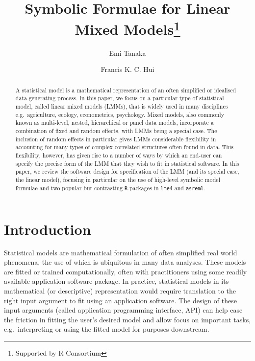 \documentclass[runningheads]{llncs}\usepackage[]{graphicx}\usepackage[]{color}
\title{Symbolic Formulae for Linear Mixed Models\thanks{Supported by R Consortium}}
\author{Emi Tanaka\inst{1,2} \and Francis K. C. Hui\inst{3}}
\institute{The University of Sydney, Camperdown NSW 2008, Australia\\\and
Monash University, VIC 3800, Australia\\\email{\href{mailto:dr.emi.tanaka@gmail.com}{\nolinkurl{emi.tanaka@monash.edu}}}\\ \and Australian National University, Acton ACT 2601, Australia\\\email{\href{mailto:francis.hui@anu.edu.au}{\nolinkurl{francis.hui@anu.edu.au}}}\\}
\begin{document}
\maketitle              %

\begin{abstract}
A statistical model is a mathematical representation of an often simplified or idealised data-generating process. In this paper, we focus on a particular type of statistical model, called linear mixed models (LMMs), that is widely used in many disciplines e.g.~agriculture, ecology, econometrics, psychology. Mixed models, also commonly known as multi-level, nested, hierarchical or panel data models, incorporate a combination of fixed and random effects, with LMMs being a special case. The inclusion of random effects in particular gives LMMs considerable flexibility in accounting for many types of complex correlated structures often found in data. This flexibility, however, has given rise to a number of ways by which an end-user can specify the precise form of the LMM that they wish to fit in statistical software. In this paper, we review the software design for specification of the LMM (and its special case, the linear model), focusing in particular on the use of high-level symbolic model formulae and two popular but contrasting \texttt{R}-packages in \texttt{lme4} and \texttt{asreml}.
\end{abstract}

\section{Introduction}\label{introduction}

Statistical models are mathematical formulation of often simplified real world phenomena, the use of which is ubiquitous in many data analyses. These models are fitted or trained computationally, often with practitioners using some readily available application software package. In practice, statistical models in its mathematical (or descriptive) representation would require translation to the right input argument to fit using an application software. The design of these input arguments (called application programming interface, API) can help ease the friction in fitting the user's desired model and allow focus on important tasks, e.g.~interpreting or using the fitted model for purposes downstream.
\end{document}
